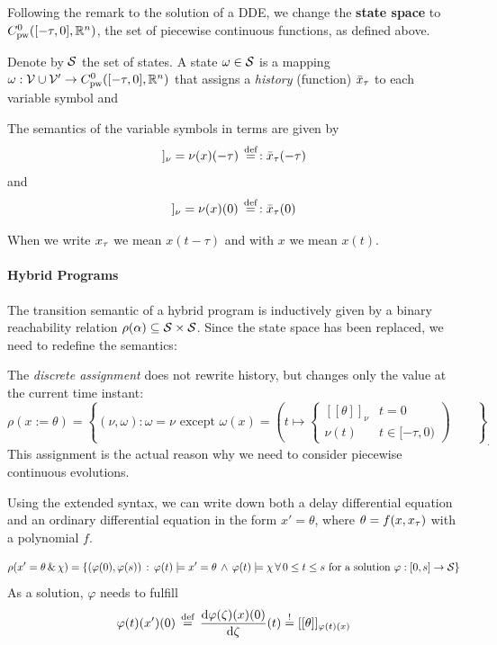 \documentclass[10pt]{article}
\begin{document}
Following the remark to the solution of a DDE, we change the \textbf{state space} to $C^0_\text{pw}([-\tau,0],\mathbb{R}^n)$, the set of piecewise continuous functions, as defined above.


Denote by $\mathcal{S}$ the set of states. A state $\omega\in\mathcal{S}$ is a mapping $\omega : \mathcal{V}\cup\mathcal{V'}\rightarrow C^0_\text{pw}([-\tau,0],\mathbb{R}^n)$ that assigns a \emph{history} (function) $\bar{x}_{\tau}$ to each variable symbol and

The semantics of the variable symbols in terms are given by
\begin{equation}
    [[\xtau]]_\nu=\nu(x)(-\tau)\defeq:\xbartau(-\tau)
\end{equation}
and
\begin{equation}
    [[x]]_\nu=\nu(x)(0)\defeq:\xbartau(0)
\end{equation}

When we write $x_{\tau}$ we mean $x(t-\tau)$ and with $x$ we mean $x(t)$.

\paragraph{Hybrid Programs}\label{hybrid-programs}

The transition semantic of a hybrid program is inductively given by a binary reachability relation $\rho(\alpha)\subseteq\mathcal{S}\times\mathcal{S}$. Since the state space has been replaced, we need to redefine the semantics:

The \emph{discrete assignment} does not rewrite history, but changes only the value at the current time instant:
\begin{equation}
\rho(x:=\theta) = \left\{(\nu,\omega): \omega = \nu \text{ except } \omega(x)=\left(t\mapsto\begin{cases}[[\theta]]_\nu & t=0\\ \nu(t) &t\in[-\tau,0)\end{cases}\right)\qquad\right\}_.
\end{equation}
This assignment is the actual reason why we need to consider piecewise continuous evolutions.


Using the extended syntax, we can write down both a delay differential equation and an ordinary differential equation in the form $x'=\theta$, where $\theta=f(x,x_{\tau})$ with a polynomial $f$.

\begin{equation}
    \rho(x'=\theta\,\&\,\chi) = \left\{ (\varphi(0),\varphi(s))\,:\,\varphi(t)\models x'=\theta\,\wedge\,\varphi(t)\models\chi\,\forall\,0\leq t\leq s\text{ for a solution } \varphi:[0,s]\rightarrow\mathcal{S} \right\}
\end{equation} As a solution, $\varphi$ needs to fulfill \begin{equation}
    \varphi(t)(x')(0) \,\stackrel{\text{def}}{=}\, \frac{\text{d} \varphi(\zeta)(x)(0)}{\text{d} \zeta}(t) \stackrel{!}{=} [[\theta]]_{\varphi(t)(x)}
\end{equation}
\end{document}
